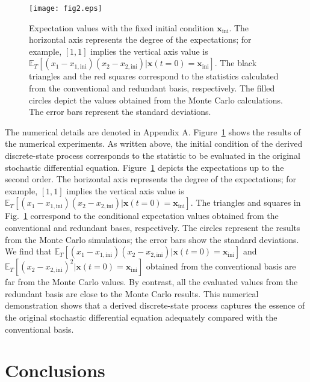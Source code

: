 \documentclass[sn-mathphys,Numbered]{sn-jnl}%
\theoremstyle{thmstyleone}%
\theoremstyle{thmstyletwo}%
\theoremstyle{thmstylethree}%
\begin{document}
\begin{figure}[tbp]
  \centering
  \texttt{[image: fig2.eps]}
  \caption{
Expectation values with the fixed initial condition $\bm{x}_\mathrm{ini}$. The horizontal axis represents the degree of the expectations; for example, $[1,1]$ implies the vertical axis value is $\mathbb{E}_T[(x_1 - x_{1, \mathrm{ini}})(x_2 - x_{2,\mathrm{ini}}) | \bm{x}(t=0) = \bm{x}_\mathrm{ini}]$. The black triangles and the red squares correspond to the statistics calculated from the conventional and redundant basis, respectively. The filled circles depict the values obtained from the Monte Carlo calculations. The error bars represent the standard deviations.
}
  \label{fig:experiment_result}
\end{figure}

The numerical details are denoted in Appendix A. Figure~\ref{fig:experiment_result} shows the results of the numerical experiments. As written above, the initial condition of the derived discrete-state process corresponds to the statistic to be evaluated in the original stochastic differential equation. Figure~\ref{fig:experiment_result} depicts the expectations up to the second order. The horizontal axis represents the degree of the expectations; for example, $[1,1]$ implies the vertical axis value is $\mathbb{E}_T[(x_1 - x_{1, \mathrm{ini}})(x_2 - x_{2,\mathrm{ini}}) | \bm{x}(t=0) = \bm{x}_\mathrm{ini}]$. The triangles and squares in Fig.~\ref{fig:experiment_result} correspond to the conditional expectation values obtained from the conventional and redundant bases, respectively. The circles represent the results from the Monte Carlo simulations; the error bars show the standard deviations. We find that $\mathbb{E}_T[(x_1 - x_{1,\mathrm{ini}})(x_2 - x_{2,\mathrm{ini}})| \bm{x}(t=0) = \bm{x}_\mathrm{ini}]$ and $\mathbb{E}_T[(x_2 - x_{2,\mathrm{ini}})^2| \bm{x}(t=0) = \bm{x}_\mathrm{ini}]$ obtained from the conventional basis are far from the Monte Carlo values. By contrast, all the evaluated values from the redundant basis are close to the Monte Carlo results. This numerical demonstration shows that a derived discrete-state process captures the essence of the original stochastic differential equation adequately compared with the conventional basis. 



\section{Conclusions}
\end{document}
